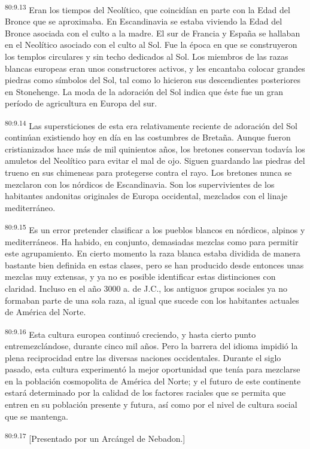 \par
\textsuperscript{80:9.13} Eran los tiempos del Neolítico, que coincidían en parte con la Edad del Bronce que se aproximaba. En Escandinavia se estaba viviendo la Edad del Bronce asociada con el culto a la madre. El sur de Francia y España se hallaban en el Neolítico asociado con el culto al Sol. Fue la época en que se construyeron los templos circulares y sin techo dedicados al Sol. Los miembros de las razas blancas europeas eran unos constructores activos, y les encantaba colocar grandes piedras como símbolos del Sol, tal como lo hicieron sus descendientes posteriores en Stonehenge. La moda de la adoración del Sol indica que éste fue un gran período de agricultura en Europa del sur.

\par
\textsuperscript{80:9.14} Las supersticiones de esta era relativamente reciente de adoración del Sol continúan existiendo hoy en día en las costumbres de Bretaña. Aunque fueron cristianizados hace más de mil quinientos años, los bretones conservan todavía los amuletos del Neolítico para evitar el mal de ojo. Siguen guardando las piedras del trueno en sus chimeneas para protegerse contra el rayo. Los bretones nunca se mezclaron con los nórdicos de Escandinavia. Son los supervivientes de los habitantes andonitas originales de Europa occidental, mezclados con el linaje mediterráneo.

\par
\textsuperscript{80:9.15} Es un error pretender clasificar a los pueblos blancos en nórdicos, alpinos y mediterráneos. Ha habido, en conjunto, demasiadas mezclas como para permitir este agrupamiento. En cierto momento la raza blanca estaba dividida de manera bastante bien definida en estas clases, pero se han producido desde entonces unas mezclas muy extensas, y ya no es posible identificar estas distinciones con claridad. Incluso en el año 3000 a. de J.C., los antiguos grupos sociales ya no formaban parte de una sola raza, al igual que sucede con los habitantes actuales de América del Norte.

\par
\textsuperscript{80:9.16} Esta cultura europea continuó creciendo, y hasta cierto punto entremezclándose, durante cinco mil años. Pero la barrera del idioma impidió la plena reciprocidad entre las diversas naciones occidentales. Durante el siglo pasado, esta cultura experimentó la mejor oportunidad que tenía para mezclarse en la población cosmopolita de América del Norte; y el futuro de este continente estará determinado por la calidad de los factores raciales que se permita que entren en su población presente y futura, así como por el nivel de cultura social que se mantenga.

\par
\textsuperscript{80:9.17} [Presentado por un Arcángel de Nebadon.]